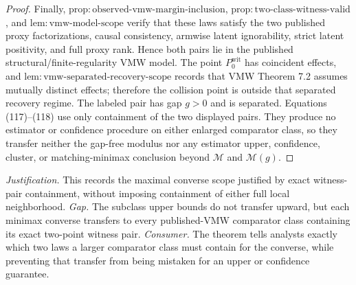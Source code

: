 \documentclass{article}
\begin{document}
\begin{proof}
Finally, \(\mathrm{prop:observed\text{-}vmw\text{-}margin\text{-}inclusion}\), \(\mathrm{prop:two\text{-}class\text{-}witness\text{-}valid}\), and \(\mathrm{lem:vmw\text{-}model\text{-}scope}\) verify that these laws satisfy the two published proxy factorizations, causal consistency, armwise latent ignorability, strict latent positivity, and full proxy rank.  Hence both pairs lie in the published structural/finite-regularity VMW model.  The point \(P_0^{\mathrm{wit}}\) has coincident effects, and \(\mathrm{lem:vmw\text{-}separated\text{-}recovery\text{-}scope}\) records that VMW Theorem 7.2 assumes mutually distinct effects; therefore the collision point is outside that separated recovery regime.  The labeled pair has gap \(g>0\) and is separated.  Equations (117)--(118) use only containment of the two displayed pairs.  They produce no estimator or confidence procedure on either enlarged comparator class, so they transfer neither the gap-free modulus nor any estimator upper, confidence, cluster, or matching-minimax conclusion beyond \(\mathcal M\) and \(\mathcal M(g)\).
\end{proof}
\par\smallskip\noindent \textit{Justification.} This records the maximal converse scope justified by exact witness-pair containment, without imposing containment of either full local neighborhood. \textit{Gap.} The subclass upper bounds do not transfer upward, but each minimax converse transfers to every published-VMW comparator class containing its exact two-point witness pair. \textit{Consumer.} The theorem tells analysts exactly which two laws a larger comparator class must contain for the converse, while preventing that transfer from being mistaken for an upper or confidence guarantee.
\end{document}
